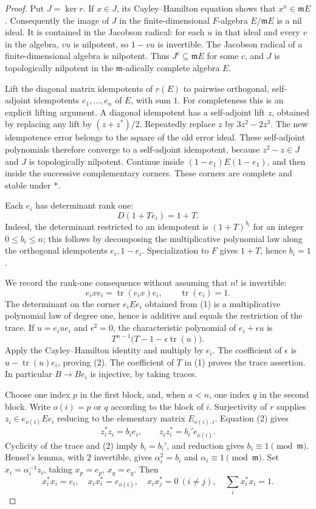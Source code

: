 \begin{proof}
Put $J=\ker r$.  If $x\in J$, its Cayley--Hamilton equation shows that
$x^n\in\mathfrak mE$.  Consequently the image of $J$ in the
finite-dimensional $F$-algebra $E/\mathfrak mE$ is a nil ideal.  It is
contained in the Jacobson radical: for each $u$ in that ideal and every
$v$ in the algebra, $vu$ is nilpotent, so $1-vu$ is invertible.  The
Jacobson radical of a finite-dimensional algebra is nilpotent.
Thus $J^c\subseteq\mathfrak mE$ for some $c$, and $J$ is topologically
nilpotent in the $\mathfrak m$-adically complete algebra $E$.

Lift the diagonal matrix idempotents of $r(E)$ to pairwise orthogonal,
self-adjoint idempotents $e_1,\ldots,e_n$ of $E$, with sum $1$.
For completeness this is an explicit lifting argument.  A diagonal
idempotent has a self-adjoint lift $z$, obtained by replacing any lift
by $(z+z^*)/2$.  Repeatedly replace $z$ by $3z^2-2z^3$.
The new idempotence error belongs to the square of the old error
ideal.  These self-adjoint polynomials therefore converge to a
self-adjoint idempotent, because $z^2-z\in J$ and $J$ is topologically
nilpotent.  Continue inside $(1-e_1)E(1-e_1)$, and then inside the
successive complementary corners.  These corners are complete and
stable under $*$.

Each $e_i$ has determinant rank one:
\[
                 D(1+Te_i)=1+T.                 \tag{1}
\]
Indeed, the determinant restricted to an idempotent is $(1+T)^{b_i}$
for an integer $0\leq b_i\leq n$; this follows by decomposing the
multiplicative polynomial law along the orthogonal idempotents
$e_i,1-e_i$.  Specialization to $F$ gives $1+T$, hence $b_i=1$.

We record the rank-one consequence without assuming that $n!$ is
invertible:
\[
        e_i x e_i=\operatorname{tr}(e_i x)e_i,\qquad
        \operatorname{tr}(e_i)=1.                \tag{2}
\]
The determinant on the corner $e_iEe_i$ obtained from (1) is a
multiplicative polynomial law of degree one, hence is additive and
equals the restriction of the trace.  If $u=e_iue_i$ and
$\epsilon^2=0$, the characteristic polynomial of $e_i+\epsilon u$
is
\[
       T^{n-1}\bigl(T-1-\epsilon\operatorname{tr}(u)\bigr).
\]
Apply the Cayley--Hamilton identity and multiply by $e_i$.  The
coefficient of $\epsilon$ is $u-\operatorname{tr}(u)e_i$, proving
(2).  The coefficient of $T$ in (1) proves the trace assertion.
In particular $B\to Be_i$ is injective, by taking traces.

Choose one index $p$ in the first block, and, when $a<n$, one index
$q$ in the second block.  Write $o(i)=p$ or $q$ according to the
block of $i$.  Surjectivity of $r$ supplies
$z_i\in e_{o(i)}Ee_i$ reducing to the elementary matrix $E_{o(i),i}$.
Equation (2) gives
\[
 z_i^*z_i=b_i e_i,\qquad z_i z_i^*=b_i'e_{o(i)}.
\]
Cyclicity of the trace and (2) imply $b_i=b_i'$, and reduction gives
$b_i\equiv1\pmod{\mathfrak m}$.  Hensel's lemma, with $2$ invertible,
gives $\alpha_i^2=b_i$ and $\alpha_i\equiv1\pmod{\mathfrak m}$.
Set $x_i=\alpha_i^{-1}z_i$, taking $x_p=e_p$, $x_q=e_q$.  Then
\[
 x_i^*x_i=e_i,\quad x_ix_i^*=e_{o(i)},\quad
 x_i x_j^*=0\ (i\ne j),\quad \sum_i x_i^*x_i=1.  \tag{3}
\]


\end{proof}
